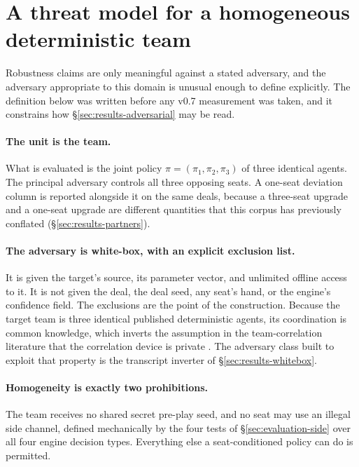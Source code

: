 \section{A threat model for a homogeneous deterministic team}
\label{sec:threat}

Robustness claims are only meaningful against a stated adversary, and the adversary appropriate to
this domain is unusual enough to define explicitly. The definition below was written before any v0.7
measurement was taken, and it constrains how \S\ref{sec:results-adversarial} may be read.

\paragraph{The unit is the team.} What is evaluated is the joint policy $\pi = (\pi_1,\pi_2,\pi_3)$
of three identical agents. The principal adversary controls all three opposing seats. A one-seat
deviation column is reported alongside it on the same deals, because a three-seat upgrade and a
one-seat upgrade are different quantities that this corpus has previously conflated
(\S\ref{sec:results-partners}).

\paragraph{The adversary is white-box, with an explicit exclusion list.} It is given the target's
source, its parameter vector, and unlimited offline access to it. It is not given the deal, the deal
seed, any seat's hand, or the engine's confidence field. The exclusions are the point of the
construction. Because the target team is three identical published deterministic agents, its
coordination is common knowledge, which inverts the assumption in the team-correlation literature
that the correlation device is private \cite{celli-gatti,farina-collusion}. The adversary class built
to exploit that property is the transcript inverter of \S\ref{sec:results-whitebox}.

\paragraph{Homogeneity is exactly two prohibitions.} The team receives no shared secret pre-play seed,
and no seat may use an illegal side channel, defined mechanically by the four tests of
\S\ref{sec:evaluation-side} over all four engine decision types. Everything else a seat-conditioned
policy can do is permitted.

